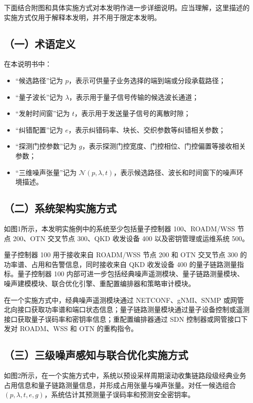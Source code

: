 \documentclass[12pt,a4paper]{article}
\begin{document}
下面结合附图和具体实施方式对本发明作进一步详细说明。应当理解，这里描述的实施方式仅用于解释本发明，并不用于限定本发明。

\subsection*{（一）术语定义}

在本说明书中：
\begin{itemize}[leftmargin=2em]
    \item ``候选路径''记为 $p$，表示可供量子业务选择的端到端或分段承载路径；
    \item ``量子波长''记为 $\lambda$，表示用于量子信号传输的候选波长通道；
    \item ``发射时间窗''记为 $t$，表示用于发送量子信号的离散时隙；
    \item ``纠错配置''记为 $e$，表示纠错码率、块长、交织参数等纠错相关参数；
    \item ``探测门控参数''记为 $g$，表示探测门控宽度、门控相位、门控偏置等接收相关参数；
    \item ``三维噪声张量''记为 $\mathcal{N}(p,\lambda,t)$，表示候选路径、波长和时间窗下的噪声环境描述。
\end{itemize}

\subsection*{（二）系统架构实施方式}

如图1所示，本发明实施例中的系统至少包括量子控制器 100、ROADM/WSS 节点 200、OTN 交叉节点 300、QKD 收发设备 400 以及密钥管理或运维系统 500。

量子控制器 100 用于接收来自 ROADM/WSS 节点 200 和 OTN 交叉节点 300 的功率谱、占用和告警信息，同时接收来自 QKD 收发设备 400 的量子链路测量指标。量子控制器 100 内部可进一步包括经典噪声遥测模块、量子链路测量模块、噪声建模模块、联合优化引擎、重配置编排器和策略审计模块。

在一个实施方式中，经典噪声遥测模块通过 NETCONF、gNMI、SNMP 或网管北向接口获取功率谱和端口状态信息；量子链路测量模块通过量子设备控制或遥测接口获取量子误码率和密钥率信息；重配置编排器通过 SDN 控制器或网管接口下发对 ROADM、WSS 和 OTN 的重构指令。

\subsection*{（三）三级噪声感知与联合优化实施方式}

如图2所示，在一个实施方式中，系统以预设采样周期滚动收集链路段级经典业务占用信息和量子链路测量信息，并形成占用张量与噪声张量。对任一候选组合 $(p,\lambda,t,e,g)$，系统估计其预测量子误码率和预测安全密钥率。
\end{document}
